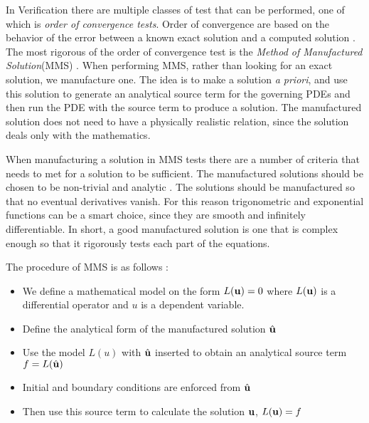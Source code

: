 In Verification there are multiple classes of test that can be performed, one of which is \textit{order of convergence tests}. Order of convergence are based on the behavior of the error between a known exact solution and a computed solution \cite{Roache2002}. The most rigorous of the order of convergence test is the \textit{Method of Manufactured Solution}(MMS) \cite{Oberkampf2010}. When performing MMS, rather than looking for an exact solution, we manufacture one. The idea is to make a solution \textit{a priori}, and use this solution to generate an analytical source term for the governing PDEs and then run the PDE with the source term to produce a solution. The manufactured solution does not need to have a physically realistic relation, since the solution deals only with the mathematics. \newline

When manufacturing a solution in MMS tests there are a number of criteria that needs to met for a solution to be sufficient. The manufactured solutions should be chosen to be non-trivial and analytic \cite{Oberkampf2010, Roache2002}. The solutions should be manufactured so that no eventual derivatives vanish. For this reason trigonometric and exponential functions can be a smart choice, since they are smooth and infinitely differentiable. In short, a good manufactured solution is one that is complex enough so that it rigorously tests each part of the equations.\newline 

The procedure of MMS is as follows \cite{Oberkampf2010}:
\begin{itemize}
\item We define a mathematical model on the form $ L(\bold{u}) = 0$ where $L(\bold{u})$ is a differential operator and $u$ is a dependent variable.
\item Define the analytical form of the manufactured solution $\hat{\bold{u}}$
\item Use the model $L(u)$ with $\hat{\bold{u}}$ inserted to obtain an analytical source term $ f = L(\hat{\bold{u}}) $
\item Initial and boundary conditions are enforced from $\hat{\bold{u}}$
\item Then use this source term to calculate the solution $\bold{u}$, $L(\bold{u}) = f $
\end{itemize}

